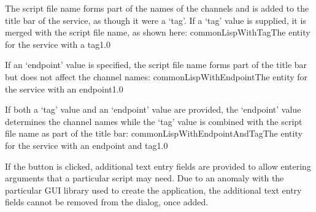 The script file name forms part of the names of the channels and is added to the title bar
of the service, as though it were a `tag'.
\condPage{}
If a `tag' value is supplied, it is merged with the script file name, as shown here:
%
{commonLispWithTag}{The \emph{\MMMU} entity for the \emph{\CLF} service with a tag}{1.0}

If an `endpoint' value is specified, the script file name forms part of the title bar but
does not affect the channel names:
%
{commonLispWithEndpoint}{The \emph{\MMMU} entity for the \emph{\CLF} service with an
endpoint}{1.0}

If both a `tag' value and an `endpoint' value are provided, the `endpoint' value
determines the channel names while the `tag' value is combined with the script file name
as part of the title bar:
%
{commonLispWithEndpointAndTag}{The \emph{\MMMU} entity for the \emph{\CLF} service with an
endpoint and tag}{1.0}

If the  button is clicked, additional text entry fields are
provided to allow entering arguments that a particular script may need.
\openSq{}Due to an anomaly with the particular GUI library used to create the
\emph{\MMMU} application, the additional text entry fields cannot be removed from the
dialog, once added.\closeSq{}
\secondaryEnd
\primaryEnd{}
